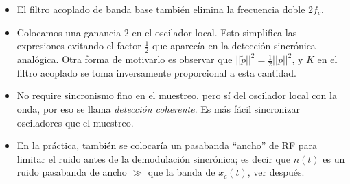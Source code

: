     \begin{itemize}
        \item El filtro acoplado de banda base también elimina la
        frecuencia doble $2f_c$.
        \item Colocamos una ganancia $2$ en el oscilador local. Esto simplifica las expresiones evitando el factor $\frac{1}{2}$ que aparecía en la detección
        sincrónica analógica.
        Otra forma de motivarlo es observar que
        $||\tilde{p}||^2=\frac{1}{2}||p||^2$, y $K$ en el filtro
        acoplado se toma inversamente proporcional a esta
        cantidad.
        \item No require sincronismo fino en el muestreo, pero sí del oscilador local con la onda, por eso se llama \emph{detección coherente}.
            Es más fácil sincronizar osciladores que el muestreo.
        \item En la práctica, también se colocaría un pasabanda ``ancho'' de RF para limitar el ruido antes de la demodulación
        sincrónica; es decir que $n(t)$ es un ruido pasabanda de ancho $\gg$ que la banda de $x_c(t)$, ver después.
    \end{itemize}

